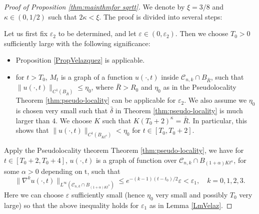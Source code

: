\documentclass[11pt]{amsart}
\numberwithin{equation}{section}
\numberwithin{equation}{section}
\newcommand{\eps}{\varepsilon}
\newcommand{\cC}{\mathcal{C}}
\begin{document}
	\begin{proof}[Proof of Proposition \ref{thm:mainthmfor sqrtt}]
		We denote by $\xi=3/8$ and $\kappa\in(0,1/2)$ such that $2\kappa<\xi$. The proof is divided into several steps:
		
		 Let us first fix $\eps_2$ to be determined, and let $\eps\in(0,\eps_2)$. Then we choose $T_0>0$ sufficiently large with the following significance: 
		\begin{itemize}
			\item Proposition \ref{PropVelazquez} is applicable.
			\item for $t>T_0$, $M_t$ is a graph of a function $u(\cdot,t)$ inside $\cC_{n,k}\cap B_{\bar R}$, such that $\|u(\cdot,t)\|_{C^1(B_{\bar R})}\leq \eta_0$, where $\bar R>R_0$ and $\eta_0$ as in the Pseudolocality Theorem \ref{thm:pseudo-locality} can be applicable for $\eps_2$. We also assume we $\eta_0$ is chosen very small such that $\bar\delta$ in Theorem \ref{thm:pseudo-locality} is much larger than $4$. We choose $K$ such that $K(T_0+2)^{\kappa}=\bar R$. In particular, this shows that $\|u(\cdot,t)\|_{C^1(B_{Kt^\kappa})}<\eta_0$ for $t\in[T_0,T_0+2]$.
		\end{itemize}
		
		Apply the Pseudolocality theorem Theorem \ref{thm:pseudo-locality}, we have for $t\in[T_0+2,T_0+4]$, $u(\cdot,t)$ is a graph of function over $\cC_{n,k}\cap B_{(1+\alpha)Kt^{\kappa}}$, for some $\alpha>0$ depending on $\mathrm{t}$, such that $$\|\nabla^ku(\cdot,t)\|_{L^\infty(\cC_{n,k}\cap B_{(1+\alpha)Kt^{\kappa}})}\leq e^{-(k-1)(t-t_0)/2}\eps<\eps_1, \quad k=0,1,2,3.$$ Here we can choose $\eps$ sufficiently small (hence $\eta_0$ very small and possibly $T_0$ very large) so that the above inequality holds for $\eps_1$ as in Lemma \ref{LmVelaz}. 
		

\end{proof}
\end{document}
